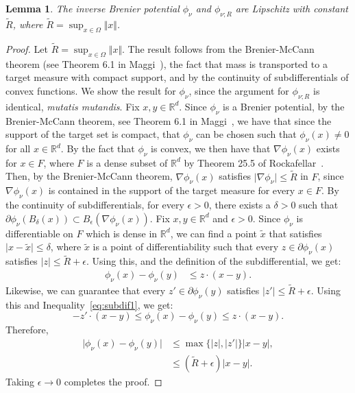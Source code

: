 \documentclass{amsart}
\theoremstyle{lemma}
\newtheorem{lemma}[theorem]{Lemma}
\theoremstyle{remark}
\begin{document}
\begin{lemma}\label{lemma:lipschitz}
The inverse Brenier potential $\phi_{\nu}$ and $\phi_{\nu;R}$ are Lipschitz with constant $\tilde{R}$, where $\tilde{R} = \sup_{x \in \Omega} \Vert x \Vert$.
\end{lemma}
\begin{proof}
Let $\tilde{R} = \sup_{x \in \Omega} \Vert x \Vert$. The result follows from the Brenier-McCann theorem (see Theorem 6.1 in Maggi~\cite{maggi}), the fact that mass is transported to a target measure with compact support, and by the continuity of subdifferentials of convex functions. We show the result for $\phi_{\nu}$, since the argument for $\phi_{\nu;R}$ is identical, \textit{mutatis mutandis}. Fix $x, y \in \mathbb{R}^d$. Since $\phi_{\nu}$ is a Brenier potential, by the Brenier-McCann theorem, see Theorem 6.1 in Maggi~\cite{maggi}, we have that since the support of the target set is compact, that $\phi_{\nu}$ can be chosen such that $\phi_{\nu}(x) \neq 0$ for all $x \in \mathbb{R}^d$. By the fact that $\phi_{\nu}$ is convex, we then have that $\nabla \phi_{\nu}(x)$ exists for $x \in F$, where $F$ is a dense subset of $\mathbb{R}^d$ by Theorem 25.5 of Rockafellar~\cite{rockafellar}. Then, by the Brenier-McCann theorem, $\nabla \phi_{\nu}(x)$ satisfies $\vert \nabla \phi_{\nu} \vert \leq \tilde{R}$ in $F$, since $\nabla \phi_{\nu}(x)$ is contained in the support of the target measure for every $x \in F$. By the continuity of subdifferentials, for every $\epsilon>0$, there exists a $\delta>0$ such that $\partial \phi_{\nu}(B_{\delta}(x)) \subset B_{\epsilon} (\nabla \phi_{\nu}(x))$. Fix $x, y \in \mathbb{R}^d$ and $\epsilon>0$. Since $\phi_{\nu}$ is differentiable on $F$ which is dense in $\mathbb{R}^d$, we can find a point $\tilde{x}$ that satisfies $\vert x - \tilde{x} \vert \leq \delta$, where $\tilde{x}$ is a point of differentiability such that every $z \in \partial \phi_{\nu}(x)$ satisfies $\vert z \vert \leq \tilde{R}+\epsilon$. Using this, and the definition of the subdifferential, we get:
\begin{align}\label{eq:subdif1}
\phi_{\nu}(x)-\phi_{\nu}(y) &\leq z \cdot (x - y).
\end{align}
Likewise, we can guarantee that every $z' \in \partial \phi_{\nu}(y)$ satisfies $\vert z' \vert \leq \tilde{R}+\epsilon$. Using this and Inequality~\eqref{eq:subdif1}, we get:
\begin{equation}
-z' \cdot (x - y) \leq \phi_{\nu}(x)-\phi_{\nu}(y) \leq z \cdot (x - y).
\end{equation}
Therefore,
\begin{align}
\vert \phi_{\nu}(x)-\phi_{\nu}(y) \vert &\leq \max \{ \vert z \vert, \vert z' \vert \} \vert x - y \vert, \\
&\leq (\tilde{R} + \epsilon) \vert x - y \vert.
\end{align}
Taking $\epsilon \rightarrow 0$ completes the proof.
\end{proof}
\end{document}
